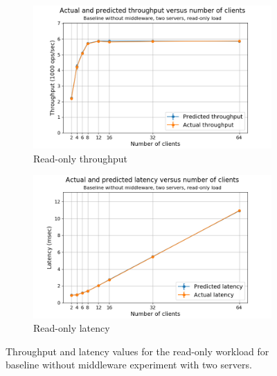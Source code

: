\documentclass[11pt,a4paper]{article}
\begin{document}
\begin{figure}[h]
\centering
\begin{subfigure}{.5\textwidth}
  \centering
  \includegraphics[width=1.0\linewidth,trim={20px 0px 35px 0px},clip]{img/plot/csb2-ro-law_tpt.png}
  \caption{Read-only throughput}
  \label{fig:csb2-ro-law_tpt}
\end{subfigure}%
\begin{subfigure}{.5\textwidth}
  \centering
  \includegraphics[width=1.0\linewidth,trim={20px 0px 40px 0px},clip]{img/plot/csb2-ro-law_lat.png}
  \caption{Read-only latency}
  \label{fig:csb2-ro-law_lat}
\end{subfigure}
\caption{Throughput and latency values for the read-only workload for baseline without middleware experiment with two servers.}
\label{fig:csb2-ro-law}
\end{figure}
\end{document}
